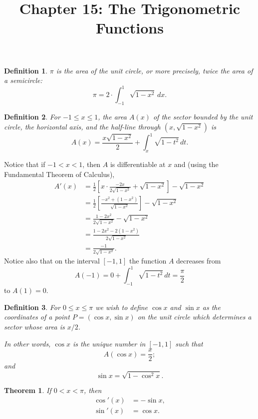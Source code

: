 \documentclass{article}
\newtheorem{definition}{Definition}
\newtheorem{theorem}{Theorem}
\begin{document}
\title{Chapter 15: The Trigonometric Functions}
\maketitle

\begin{definition}
  $\pi$ is the area of the unit circle, or more precisely, twice the area of a
  semicircle: \[
    \pi = 2 \cdot \int_{-1}^1 \sqrt{1 - x^2} \,dx.
  \]
\end{definition}

\begin{definition}
  For $-1 \leq x \leq 1$, the area $A(x)$ of the sector bounded by the unit
  circle, the horizontal axis, and the half-line through $(x, \sqrt{1 - x^2})$
  is \[
    A(x) = \frac{x\sqrt{1 - x^2}}{2} + \int_x^1 \sqrt{1 - t^2} \,dt.
  \]
\end{definition}

Notice that if $-1 < x < 1$, then $A$ is differentiable at $x$ and (using the
Fundamental Theorem of Calculus),
\begin{align*}
  A'(x)
  &= \frac{1}{2}\left[
    x \cdot \frac{-2x}{2\sqrt{1 - x^2}}
    + \sqrt{1 - x^2}
  \right] - \sqrt{1 - x^2} \\
  &= \frac{1}{2}\left[ \frac{-x^2 + (1 - x^2)}{\sqrt{1 - x^2}} \right] -
  \sqrt{1 - x^2} \\
  &= \frac{1 - 2x^2}{2\sqrt{1 - x^2}} - \sqrt{1 - x^2} \\
  &= \frac{1 - 2x^2 - 2(1 - x^2)}{2\sqrt{1 - x^2}} \\
  &= \frac{-1}{2\sqrt{1 - x^2}}.
\end{align*} Notice also that on the interval $[-1, 1]$ the function $A$
decreases from \[
  A(-1) = 0 + \int_{-1}^1 \sqrt{1 - t^2} \,dt = \frac{\pi}{2}
\] to $A(1) = 0$.

\begin{definition}
  For $0 \leq x \leq \pi$ we wish to define $\cos x$ and $\sin x$ as the
  coordinates of a point $P = (\cos x, \sin x)$ on the unit circle which
  determines a sector whose area is $x/2$.

  In other words, $\cos x$ is the unique number in $[-1, 1]$ such that
  \[
    A(\cos x) = \frac{x}{2};
  \] and \[
    \sin x = \sqrt{1 - \cos^2 x}.
  \]
\end{definition}

\begin{theorem}
  If $0 < x < \pi$, then
  \begin{align*}
    \cos'(x) &= -\sin x, \\
    \sin'(x) &= \cos x.
  \end{align*}
\end{theorem}
\end{document}
